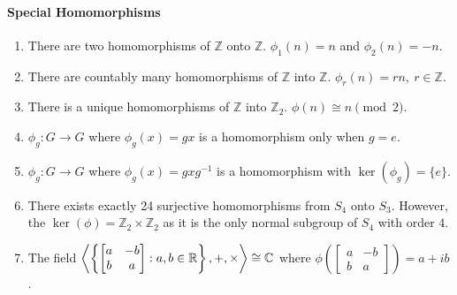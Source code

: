 \paragraph{Special Homomorphisms}
\begin{enumerate}
	\item There are  two homomorphisms of $\mathbb{Z}$ onto $\mathbb{Z}$. $\phi_1(n) = n$ and $\phi_2(n) = -n$.
	\item There are countably many homomorphisms of $\mathbb{Z}$ into $\mathbb{Z}$. $\phi_r(n) = rn,\ r \in \mathbb{Z}$.
	\item There is a unique homomorphisms of $\mathbb{Z}$ into $\mathbb{Z}_2$. $\phi(n) \cong n \pmod{2}$.
	\item $\phi_g : G \to G$ where $\phi_g(x) = gx$ is a homomorphism only when $g = e$.
	\item $\phi_g : G \to G$ where $\phi_g(x) = gxg^{-1}$ is a homomorphism with $\ker(\phi_g) = \{ e \}$.
	\item There exists exactly 24 surjective homomorphisms from $S_4$ onto $S_3$. However, the $\ker(\phi) = \mathbb{Z}_2 \times \mathbb{Z}_2$ as it is the only normal subgroup of $S_4$ with order $4$.
	\item The field $\left\langle \left\{\begin{bmatrix} a & -b \\ b & a \end{bmatrix} : a,b \in \mathbb{R} \right\},+,\times \right\rangle \cong \mathbb{C}$ where $\phi\left(\begin{bmatrix} a & -b \\ b & a \end{bmatrix}\right) = a+ib$.
\end{enumerate}

